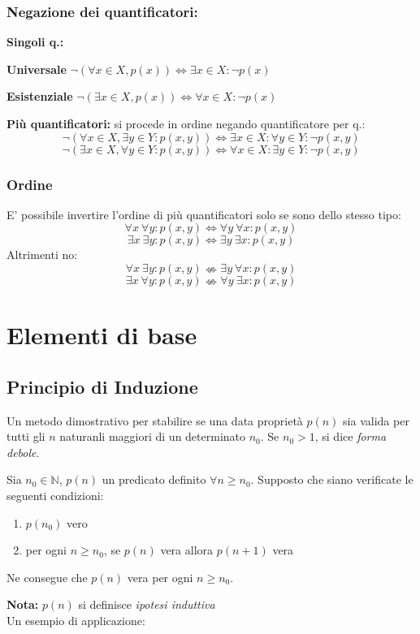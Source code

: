 \documentclass[10pt]{article}
\theoremstyle{plain}
\begin{document}
\subsubsection*{Negazione dei quantificatori:}
\begin{description}
\item \textbf{Singoli q.:}
   \item[$\star$] \textbf{Universale} $\neg (\forall x \in X, p(x)) \Longleftrightarrow \exists x \in X : \neg p(x)$
   \item[$\star$] \textbf{Esistenziale} $\neg (\exists x \in X, p(x)) \Longleftrightarrow \forall x \in X : \neg p(x)$
   \item \textbf{Più quantificatori:} si procede in ordine negando quantificatore per q.:
   \[\neg (\forall x \in X, \exists y \in Y : p(x,y)) \Longleftrightarrow \exists x \in X : \forall y \in Y : \neg p(x,y)\]
    \[\neg (\exists x \in X, \forall y \in Y : p(x,y)) \Longleftrightarrow \forall x \in X : \exists y \in Y : \neg p(x,y)\]
\end{description}
\subsubsection*{Ordine}
E' possibile invertire l'ordine di più quantificatori solo se sono dello stesso tipo:
\[\forall x {\ }\forall y : p(x,y) \Longleftrightarrow \forall y {\ }\forall x : p(x,y)\]
\[\exists x {\ }\exists y : p(x,y) \Longleftrightarrow  \exists y {\ }\exists x : p(x,y)\]
Altrimenti no:
\[\forall x {\ }\exists y : p(x,y) \nLeftrightarrow \exists y {\ }\forall x : p(x,y)\]
\[\exists x {\ }\forall y : p(x,y) \nLeftrightarrow \forall y {\ }\exists x : p(x,y)\]

\section{Elementi di base}
\subsection{Principio di Induzione}
Un metodo dimostrativo per stabilire se una data proprietà $p(n)$ sia valida per tutti gli $n$ naturanli maggiori di un determinato $n_0$. Se $n_0 > 1$, si dice \textit{forma debole}.
\begin{ther}
Sia $n_0 \in \mathbb{N}$, $p(n)$ un predicato definito $\forall n \geq n_0$. Supposto che siano verificate le seguenti condizioni:
\begin{enumerate}[label = \Roman*)]
    \item $p(n_0)$ vero
    \item per ogni $n \geq n_0$, se $p(n)$ vera allora $p(n+1)$ vera
\end{enumerate}
Ne consegue che $p(n)$ vera per ogni $n \geq n_0$.
\end{ther}
\textbf{Nota:} $p(n)$ si definisce \textit{ipotesi induttiva}
\\Un esempio di applicazione:
\end{document}
